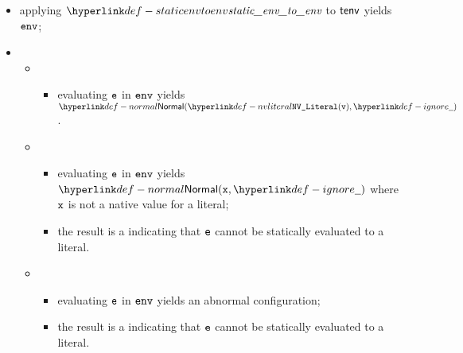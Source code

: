 \ProseParagraph
\AllApply
\begin{itemize}
  \item applying $\staticenvtoenv$ to $\tenv$ yields $\env$;
  \item \OneApplies
  \begin{itemize}
    \item {}
    \begin{itemize}
      \item evaluating $\ve$ in $\env$ yields $\Normal(\nvliteral{\vv}, \Ignore)$.
    \end{itemize}

    \item {}
    \begin{itemize}
      \item evaluating $\ve$ in $\env$ yields $\Normal(\vx, \Ignore)$
            where $\vx$ is not a native value for a literal;
      \item the result is a \typingerrorterm{} indicating that $\ve$ cannot be statically evaluated to a literal.
    \end{itemize}

    \item {}
    \begin{itemize}
      \item evaluating $\ve$ in $\env$ yields an abnormal configuration;
      \item the result is a \typingerrorterm{} indicating that $\ve$ cannot be statically evaluated to a literal.
    \end{itemize}
  \end{itemize}
\end{itemize}

\FormallyParagraph
\begin{mathpar}
\end{mathpar}

\begin{mathpar}
\end{mathpar}

